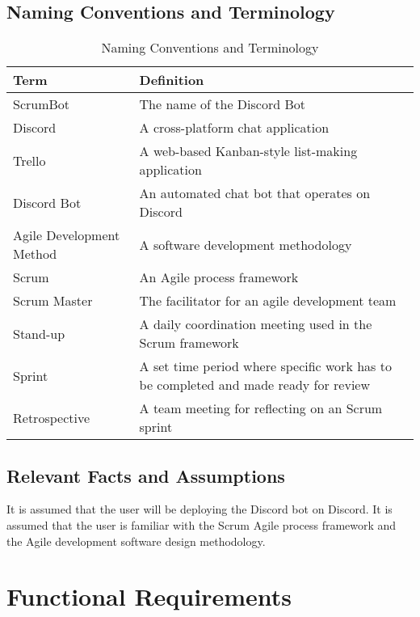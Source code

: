\documentclass[12pt, titlepage]{article}
\begin{document}
\subsection{Naming Conventions and Terminology}
\begin{table}[H]
    \caption{Naming Conventions and Terminology}
    \centering
    \begin{tabular}{ |p{5cm}|p{9cm}|  }
     \hline
     \textbf{Term} & \textbf{Definition} \\
     \hline
     ScrumBot & The name of the Discord Bot \\
     \hline
     Discord & A cross-platform chat application\\
     \hline
     Trello & A web-based Kanban-style list-making application\\
     \hline
     Discord Bot & An automated chat bot that operates on Discord\\
     \hline
     Agile Development Method & A software development methodology\\
     \hline
     Scrum & An Agile process framework\\
     \hline
     Scrum Master & The facilitator for an agile development team\\
     \hline
     Stand-up & A daily coordination meeting used in the Scrum framework\\
     \hline
      Sprint & A set time period where specific work has to be completed and made ready for review\\
     \hline
     Retrospective & A team meeting for reflecting on an Scrum sprint\\
     \hline
    \end{tabular}
\end{table}

\FloatBarrier

\subsection{Relevant Facts and Assumptions}

It is assumed that the user will be deploying the Discord bot on Discord. It is assumed that the user is familiar with the Scrum Agile process framework and the Agile development software design methodology.

\section{Functional Requirements}
\end{document}
